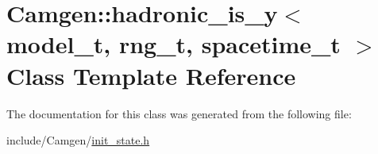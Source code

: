 \hypertarget{a00258}{\section{Camgen\-:\-:hadronic\-\_\-is\-\_\-y$<$ model\-\_\-t, rng\-\_\-t, spacetime\-\_\-t $>$ Class Template Reference}
\label{a00258}
}


The documentation for this class was generated from the following file\-:\begin{DoxyCompactItemize}
\item 
include/\-Camgen/\hyperlink{a00649}{init\-\_\-state.\-h}\end{DoxyCompactItemize}
